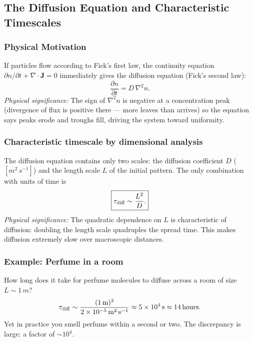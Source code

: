 \subsection{The Diffusion Equation and Characteristic Timescales}
\label{sec:lec06:diffusion-equation}

\subsubsection*{Physical Motivation}
If particles flow according to Fick's first law, the continuity equation
$\partial n/\partial t + \nabla\cdot \mathbf{J} = 0$ immediately gives the
diffusion equation (Fick's second law):
\begin{equation}
    \boxed{
    \frac{\partial n}{\partial t} = D\,\nabla^2 n .
    }
    \label{eq:lec06:diffusion-equation}
\end{equation}
\textit{Physical significance:} The sign of $\nabla^2 n$ is negative at a
concentration peak (divergence of flux is positive there — more leaves than
arrives) so the equation says peaks erode and troughs fill, driving the system
toward uniformity.

\subsubsection*{Characteristic timescale by dimensional analysis}
The diffusion equation contains only two scales: the diffusion coefficient $D$
($[\si{m^2\,s^{-1}}]$) and the length scale $L$ of the initial pattern. The
only combination with units of time is
\begin{equation}
    \boxed{
    \tau_{\rm diff} \sim \frac{L^2}{D} .
    }
    \label{eq:lec06:diffusion-timescale}
\end{equation}
\textit{Physical significance:} The quadratic dependence on $L$ is
characteristic of diffusion: doubling the length scale quadruples the spread
time. This makes diffusion extremely slow over macroscopic distances.

\subsubsection*{Example: Perfume in a room}
How long does it take for perfume molecules to diffuse across a room of size
$L \sim 1\,\si{m}$?
\begin{equation}
    \tau_{\rm diff}
    \sim \frac{(1\,\si{m})^2}{2\times10^{-5}\,\si{m^2\,s^{-1}}}
    \approx 5\times10^4\,\si{s}
    \approx 14\,\si{hours} .
    \label{eq:lec06:perfume-molecular}
\end{equation}
Yet in practice you smell perfume within a second or two. The discrepancy is
large: a factor of $\sim 10^4$.


